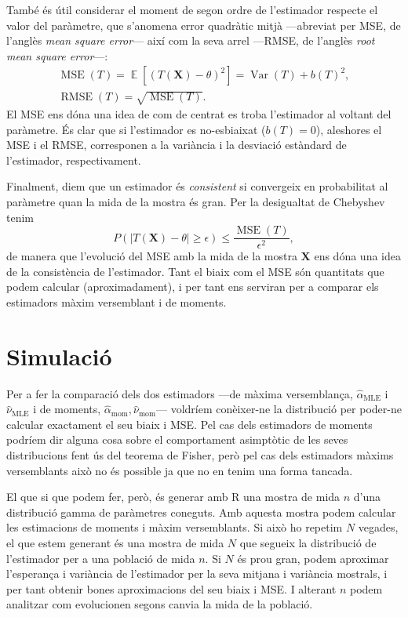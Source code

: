 \documentclass[12pt, catalan]{article}
\numberwithin{table}{section}
\numberwithin{figure}{section}
\numberwithin{equation}{section}
\DeclareMathOperator{\MSE}{MSE}
\DeclareMathOperator{\RMSE}{RMSE}
\DeclareMathOperator{\E}{\mathbb{E}}
\DeclareMathOperator{\Var}{Var}
\newcommand{\abs}[1]{\left|#1\right|}
\begin{document}
També és útil considerar el moment de segon ordre de l'estimador respecte el valor del paràmetre, que s'anomena error quadràtic mitjà ---abreviat per MSE, de l'anglès \emph{mean square error}--- així com la seva arrel ---RMSE, de l'anglès \emph{root mean square error}---:
\begin{gather*}
    \MSE{(T)} = \E{[(T(\mathbf{X})-\theta)^2]} = \Var{(T)} + b(T)^2,\\
    \RMSE{(T)} =\sqrt{\MSE{(T)}}.
\end{gather*}
El MSE ens dóna una idea de com de centrat es troba l'estimador al voltant del paràmetre. És clar que si l'estimador es no-esbiaixat ($b(T)=0$), aleshores el MSE i el RMSE, corresponen a la variància i la desviació estàndard de l'estimador, respectivament.

Finalment, diem que un estimador és \emph{consistent} si convergeix en probabilitat al paràmetre quan la mida de la mostra és gran. Per la desigualtat de Chebyshev tenim
\begin{equation*}
    P\left( \abs{T(\mathbf{X}) - \theta} \geq \epsilon \right) \leq \frac{\MSE{(T)}}{\epsilon^2},
\end{equation*}
de manera que l'evolució del MSE amb la mida de la mostra $\mathbf{X}$ ens dóna una idea de la consistència de l'estimador. Tant el biaix com el MSE són quantitats que podem calcular (aproximadament), i per tant ens serviran per a comparar els estimadors màxim versemblant i de moments.

\section{Simulació}
Per a fer la comparació dels dos estimadors ---de màxima versemblança, $\hat{\alpha}_\text{MLE}$ i $\hat{\nu}_\text{MLE}$ i de moments, $\hat{\alpha}_\text{mom}, \hat{\nu}_\text{mom}$--- voldríem conèixer-ne la distribució per poder-ne calcular exactament el seu biaix i MSE. Pel cas dels estimadors de moments podríem dir alguna cosa sobre el comportament asimptòtic de les seves distribucions fent ús del teorema de Fisher, però pel cas dels estimadors màxims versemblants això no és possible ja que no en tenim una forma tancada.

El que si que podem fer, però, és generar amb R una mostra de mida $n$ d'una distribució gamma de paràmetres coneguts. Amb aquesta mostra podem calcular les estimacions de moments i màxim versemblants. Si això ho repetim $N$ vegades, el que estem generant és una mostra de mida $N$ que segueix la distribució de l'estimador per a una població de mida $n$. Si $N$ és prou gran, podem aproximar l'esperança  i variància de l'estimador per la seva mitjana i variància mostrals, i per tant obtenir bones aproximacions del seu biaix i MSE. I alterant $n$ podem analitzar com evolucionen segons canvia la mida de la població. 
\end{document}
